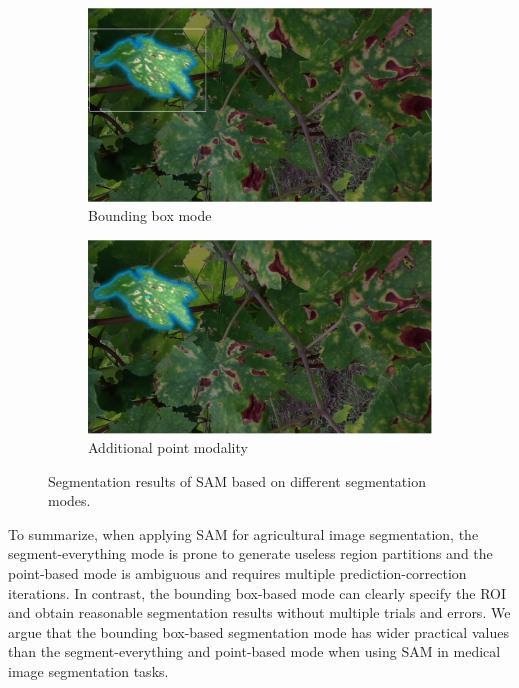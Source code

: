\documentclass[runningheads]{llncs}
\begin{document}
\begin{figure}[h!]
\begin{subfigure}[b]{.45\linewidth}
    \includegraphics[width=\linewidth]{imgs/segmentation_modes_bbox.png}
        \caption{Bounding box mode}
\end{subfigure}
\begin{subfigure}[b]{.45\linewidth}
   \includegraphics[width=\linewidth]{imgs/segmentation_modes_1point.png}
   \caption{Additional point modality}
\end{subfigure}
\caption{Segmentation results of SAM based on different segmentation modes.}
\label{fig:sam-modes}
\end{figure}

To summarize, when applying SAM for agricultural image segmentation, the segment-everything mode is prone to generate useless region partitions and the point-based mode is ambiguous and requires multiple prediction-correction iterations. In contrast, the bounding box-based mode can clearly specify the ROI and obtain reasonable segmentation results without multiple trials and errors. We argue that the bounding box-based segmentation mode has wider practical values than the segment-everything and point-based mode when using SAM in medical image segmentation tasks.
\end{document}
